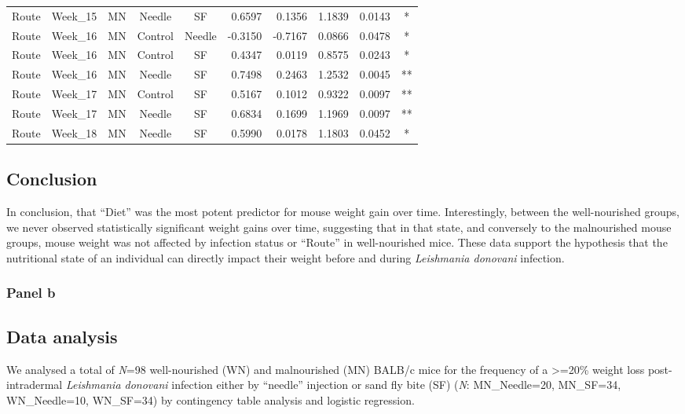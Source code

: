 \documentclass[
  12pt,
  letterpaper,
]{article}
\begin{document}
\begin{longtable}{lllccrrrrc}
Route & Week\_15 & MN & Needle & SF & 0.6597 & 0.1356 & 1.1839 & 0.0143 & * \\ 
Route & Week\_16 & MN & Control & Needle & -0.3150 & -0.7167 & 0.0866 & 0.0478 & * \\ 
Route & Week\_16 & MN & Control & SF & 0.4347 & 0.0119 & 0.8575 & 0.0243 & * \\ 
Route & Week\_16 & MN & Needle & SF & 0.7498 & 0.2463 & 1.2532 & 0.0045 & ** \\ 
Route & Week\_17 & MN & Control & SF & 0.5167 & 0.1012 & 0.9322 & 0.0097 & ** \\ 
Route & Week\_17 & MN & Needle & SF & 0.6834 & 0.1699 & 1.1969 & 0.0097 & ** \\ 
Route & Week\_18 & MN & Needle & SF & 0.5990 & 0.0178 & 1.1803 & 0.0452 & * \\ 
\bottomrule
\end{longtable}

\subsection{Conclusion}\label{conclusion-2}

In conclusion, that ``Diet'' was the most potent predictor for mouse weight gain over time. Interestingly, between the well-nourished groups, we never observed statistically significant weight gains over time, suggesting that in that state, and conversely to the malnourished mouse groups, mouse weight was not affected by infection status or ``Route'' in well-nourished mice. These data support the hypothesis that the nutritional state of an individual can directly impact their weight before and during \emph{Leishmania donovani} infection.

\subsubsection{Panel b}\label{panel-b-1}

\subsection{Data analysis}\label{data-analysis-5}

We analysed a total of \emph{N}=98 well-nourished (WN) and malnourished (MN) BALB/c mice for the frequency of a \textgreater=20\% weight loss post-intradermal \emph{Leishmania donovani} infection either by ``needle'' injection or sand fly bite (SF) (\emph{N}: MN\_Needle=20, MN\_SF=34, WN\_Needle=10, WN\_SF=34) by contingency table analysis and logistic regression.
\end{document}
